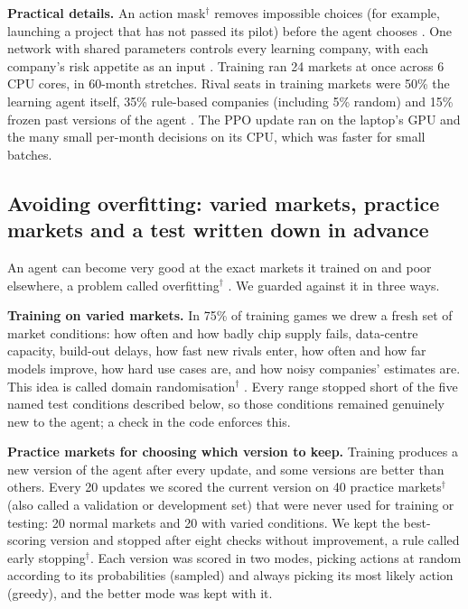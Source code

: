 \documentclass[11pt]{article}
\newcommand{\gl}[1]{#1\hyperref[app:glossary]{$^{\dagger}$}}
\begin{document}
\textbf{Practical details.} An \gl{action mask} removes impossible choices (for example, launching a project that has not passed its pilot) before the agent chooses \citep{huang2022masking}. One network with shared parameters controls every learning company, with each company's risk appetite as an input \citep{yu2022mappo}. Training ran 24 markets at once across 6 CPU cores, in 60-month stretches. Rival seats in training markets were 50\% the learning agent itself, 35\% rule-based companies (including 5\% random) and 15\% frozen past versions of the agent \citep{vinyals2019alphastar}. The PPO update ran on the laptop's GPU and the many small per-month decisions on its CPU, which was faster for small batches.

\subsection{Avoiding overfitting: varied markets, practice markets and a test written down in advance}
\label{sec:protocol}

An agent can become very good at the exact markets it trained on and poor elsewhere, a problem called \gl{overfitting} \citep{cobbe2019generalization}. We guarded against it in three ways.

\textbf{Training on varied markets.} In 75\% of training games we drew a fresh set of market conditions: how often and how badly chip supply fails, data-centre capacity, build-out delays, how fast new rivals enter, how often and how far models improve, how hard use cases are, and how noisy companies' estimates are. This idea is called \gl{domain randomisation} \citep{tobin2017domain}. Every range stopped short of the five named test conditions described below, so those conditions remained genuinely new to the agent; a check in the code enforces this.

\textbf{Practice markets for choosing which version to keep.} Training produces a new version of the agent after every update, and some versions are better than others. Every 20 updates we scored the current version on 40 \gl{practice markets} (also called a validation or development set) that were never used for training or testing: 20 normal markets and 20 with varied conditions. We kept the best-scoring version and stopped after eight checks without improvement, a rule called \gl{early stopping}. Each version was scored in two modes, picking actions at random according to its probabilities (sampled) and always picking its most likely action (greedy), and the better mode was kept with it.
\end{document}
